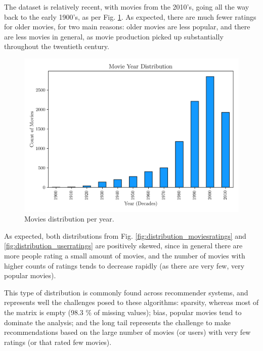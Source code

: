 \documentclass[conference]{IEEEtran}
\begin{document}
The dataset is relatively recent, with movies from the 2010's, going all the way back to the early 1900's, as per Fig. \ref{fig:year_distribution}. As expected, there are much fewer ratings for older movies, for two main reasons: older movies are less popular, and there are less movies in general, as movie production picked up substantially throughout the twentieth century.

\begin{figure}[H]
    \centering
    \includegraphics[width=1\linewidth]{assets/year_distribution.png}
    \caption{Movies distribution per year.}
    \label{fig:year_distribution}
\end{figure}

As expected, both distributions from Fig. \ref{fig:distribution_moviesratings} and \ref{fig:distribution_userratings} are positively skewed, since in general there are more people rating a small amount of movies, and the number of movies with higher counts of ratings tends to decrease rapidly (as there are very few, very popular movies).

This type of distribution is commonly found across recommender systems, and represents well the challenges posed to these algorithms: sparsity, whereas most of the matrix is empty (98.3 \% of missing values); bias, popular movies tend to dominate the analysis; and the long tail represents the challenge to make recommendations based on the large number of movies (or users) with very few ratings (or that rated few movies).
\end{document}
